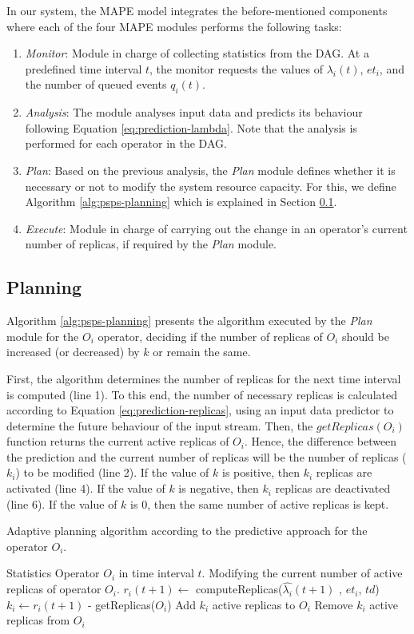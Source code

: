 In our system, the MAPE model integrates the before-mentioned components where each of the four MAPE modules performs the following tasks: 
\begin{enumerate} 
    \item \textit{Monitor}: Module in charge of collecting statistics from the DAG. At a predefined time interval $t$, the monitor requests the values of $\lambda_i(t)$, $et_i$, and the number of queued events $q_i(t)$.
    \item \textit{Analysis}: The module analyses input data and predicts its behaviour following Equation \ref{eq:prediction-lambda}. Note that the analysis is performed for each operator in the DAG.
    \item \textit{Plan}: Based on the previous analysis, the \textit{Plan} module defines whether it is necessary or not to modify the system resource capacity. For this, we define Algorithm \ref{alg:psps-planning} which is explained in Section \ref{psps-planning}.  
    \item \textit{Execute}: Module in charge of carrying out the change in an operator's current number of replicas, if required by the \textit{Plan} module.
\end{enumerate}


\subsection{Planning}
\label{psps-planning}
Algorithm \ref{alg:psps-planning} presents the algorithm executed by the \textit{Plan} module for the $O_i$ operator, deciding if the number of replicas of $O_i$ should be increased (or decreased) by $k$ or remain the same.

First, the algorithm determines the number of replicas for the next time interval is computed (line 1). To this end, the number of necessary replicas is calculated according to Equation \ref{eq:prediction-replicas}, using an input data predictor to determine the future behaviour of the input stream. Then, the $getReplicas(O_i)$ function returns the current active replicas of $O_i$. Hence, the difference between the prediction and the current number of replicas will be the number of replicas ($k_i$) to be modified (line 2). If the value of $k$ is positive, then $k_i$ replicas are activated (line 4). If the value of $k$ is negative, then $k_i$ replicas are deactivated (line 6). If the value of $k$ is 0, then the same number of active replicas is kept.

\begin{algorithm}[!ht]
\caption{Adaptive planning algorithm according to the predictive approach for the operator $O_i$.}
 \begin{algorithmic}[1]
 	\REQUIRE Statistics Operator $O_i$ in time interval $t$.
 	\ENSURE Modifying the current number of active replicas of operator $O_i$.
	\STATE $r_i(t+1) \gets$ computeReplicas($\widehat{\lambda_i}(t+1)$ , $et_i$, $td$)
	\STATE $k_i \gets r_i(t+1)$ - getReplicas($O_i$)
		\STATE Add $k_i$ active replicas to $O_i$
		\STATE Remove $k_i$ active replicas from $O_i$
	\ENDIF
\end{algorithmic}
\label{alg:psps-planning}
\end{algorithm}